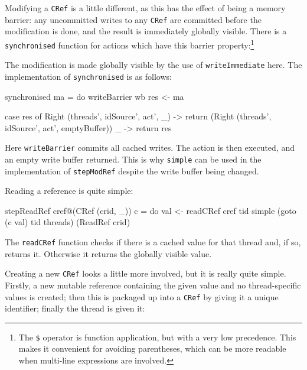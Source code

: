 Modifying a \verb|CRef| is a little different, as this has the effect
of being a memory barrier: any uncommitted writes to any \verb|CRef|
are committed before the modification is done, and the result is
immediately globally visible. There is a \verb|synchronised| function
for actions which have this barrier property:\footnote{The \texttt{\$}
  operator is function application, but with a very low
  precedence. This makes it convenient for avoiding parentheses, which
  can be more readable when multi-line expressions are involved.}


The modification is made globally visible by the use of
\verb|writeImmediate| here. The implementation of \verb|synchronised|
is as follows:

\begin{haskellcode}
synchronised ma = do
  writeBarrier wb
  res <- ma

  case res of
    Right (threads', idSource', act', _) -> return
      (Right (threads', idSource', act', emptyBuffer))
    _ -> return res
\end{haskellcode}

Here \verb|writeBarrier| commits all cached writes. The action is then
executed, and an empty write buffer returned. This is why
\verb|simple| can be used in the implementation of \verb|stepModRef|
despite the write buffer being changed.

Reading a reference is quite simple:

\begin{haskellcode}
stepReadRef cref@(CRef (crid, _)) c = do
  val <- readCRef cref tid
  simple (goto (c val) tid threads) (ReadRef crid)
\end{haskellcode}

The \verb|readCRef| function checks if there is a cached value for
that thread and, if so, returns it. Otherwise it returns the globally
visible value.

Creating a new \verb|CRef| looks a little more involved, but it is
really quite simple. Firstly, a new mutable reference containing the
given value and no thread-specific values is created; then this is
packaged up into a \verb|CRef| by giving it a unique identifier;
finally the thread is given it:

